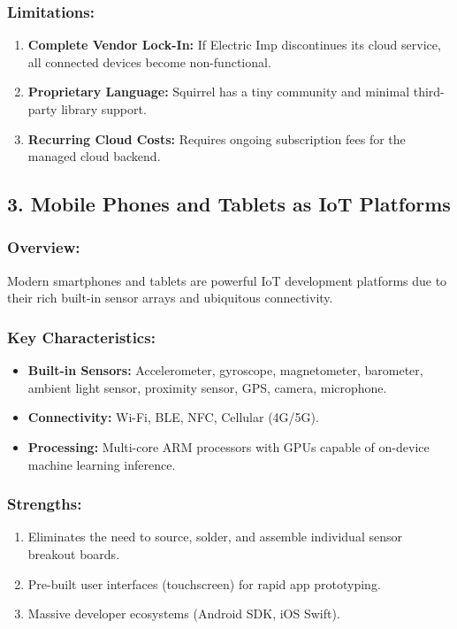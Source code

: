 \subsubsection{Limitations:}
\begin{enumerate}
  \item \textbf{Complete Vendor Lock-In:} If Electric Imp discontinues its cloud service, all connected devices become non-functional.
  \item \textbf{Proprietary Language:} Squirrel has a tiny community and minimal third-party library support.
  \item \textbf{Recurring Cloud Costs:} Requires ongoing subscription fees for the managed cloud backend.
\end{enumerate}


\subsection{3. Mobile Phones and Tablets as IoT Platforms}

\subsubsection{Overview:}
Modern smartphones and tablets are powerful IoT development platforms due to their rich built-in sensor arrays and ubiquitous connectivity.

\subsubsection{Key Characteristics:}
\begin{itemize}
  \item   \textbf{Built-in Sensors:} Accelerometer, gyroscope, magnetometer, barometer, ambient light sensor, proximity sensor, GPS, camera, microphone.
  \item   \textbf{Connectivity:} Wi-Fi, BLE, NFC, Cellular (4G/5G).
  \item   \textbf{Processing:} Multi-core ARM processors with GPUs capable of on-device machine learning inference.
\end{itemize}

\subsubsection{Strengths:}
\begin{enumerate}
  \item Eliminates the need to source, solder, and assemble individual sensor breakout boards.
  \item Pre-built user interfaces (touchscreen) for rapid app prototyping.
  \item Massive developer ecosystems (Android SDK, iOS Swift).
\end{enumerate}

